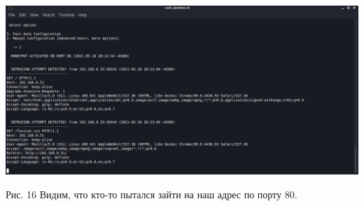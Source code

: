 \documentclass[a4paper,14pt]{extarticle}
\begin{document}
\begin{center}
        \includegraphics[scale=0.35]{pics/13_2.png}
        
        Рис. 16 Видим, что кто-то пытался зайти на наш адрес по порту 80.
        \vspace{1ex}
    \end{center}
\end{document}
